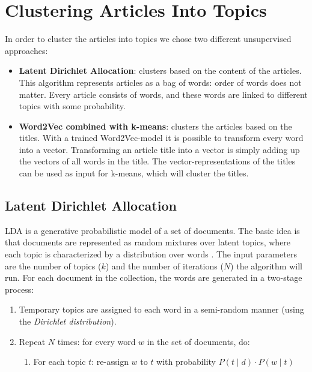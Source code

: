 \section{Clustering Articles Into Topics}
\label{sec:topic_detection}

In order to cluster the articles into topics we chose two different unsupervised approaches: 

\begin{itemize}
\item \textbf{Latent Dirichlet Allocation}: clusters based on the content of the articles. This algorithm represents articles as a bag of words: order of words does not matter. Every article consists of words, and these words are linked to different topics with some probability.
\item \textbf{Word2Vec combined with k-means}: clusters the articles based on the titles. With a trained Word2Vec-model it is possible to transform every word into a vector. Transforming an article title into a vector is simply adding up the vectors of all words in the title. 
The vector-representations of the titles can be used as input for k-means, which will cluster the titles.
\end{itemize}

\subsection{Latent Dirichlet Allocation}
LDA is a generative probabilistic model of a set of documents. The basic idea is that documents are represented as random mixtures over latent topics, where each topic is characterized by a distribution over words \cite{blei2003latent}. The input parameters are the number of topics ($k$) and the number of iterations ($N$) the algorithm will run. For each document in the collection, the words are generated in a two-stage process:

\begin{enumerate}
\item Temporary topics are assigned to each word in a semi-random manner (using the \textit{Dirichlet distribution}).
\item Repeat $N$ times: for every word $w$ in the set of documents, do:
	\begin{enumerate}
		\item For each topic $t$: re-assign $w$ to $t$ with probability $P(t \mid d) \cdot P(w \mid t)$
	\end{enumerate}
\end{enumerate}

